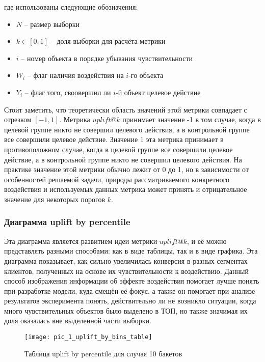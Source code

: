 где использованы следующие обозначения:
\begin{itemize}
    \item $N$ -- размер выборки
    \item $k \in [ 0, 1 ]$ -- доля выборки для расчёта метрики
    \item $i$ -- номер объекта в порядке убывания чувствительности
    \item $W_i$ -- флаг наличия воздействия на $i$-го объекта
    \item $Y_i$ -- флаг того, своовершил ли $i$-й объект целевое действие
\end{itemize}

Стоит заметить, что теоретически область значений этой метрики совпадает с отрезком $[-1, 1]$. Метрика $uplift@k$ принимает значение -1 в том случае, когда в целевой группе никто не совершил целевого действия, а в контрольной группе все совершили целевое действие. Значение 1 эта метрика принимает в противоположном случае, когда в целевой группе все совершили целевое действие, а в контрольной группе никто не совершил целевого действия. На практике значение этой метрики обычно лежит от 0 до 1, но в зависимости от особенностей решаемой задачи, природы рассматриваемого конкретного воздействия и используемых данных метрика может принять и отрицательное значение для некоторых порогов $k$.




\subsubsection*{Диаграмма uplift by percentile}

Эта диаграмма является развитием идеи метрики $uplift@k$, и её можно представлять разными способами: как в виде таблицы, так и в виде графика. Эта диаграмма показывает, как сильно увеличилась конверсия в разных сегментах клиентов, полученных на основе их чувствительности к воздействию. Данный способ изображения информации об эффекте воздействия помогает лучше понять при разработке модели, куда смещён её фокус, а также он помогает при анализе результатов эксперимента понять, действительно ли не возникло ситуации, когда много чувствительных объектов было выделено в ТОП, но также значимая их доля оказалась вне выделенной части выборки.

\begin{figure}[ht]
\centering
\texttt{[image: pic\_1\_uplift\_by\_bins\_table]}
\centering
\caption{Таблица uplift by percentile для случая 10 бакетов}
\label{fig:pic_1_uplift_by_bins_table}
\end{figure}

